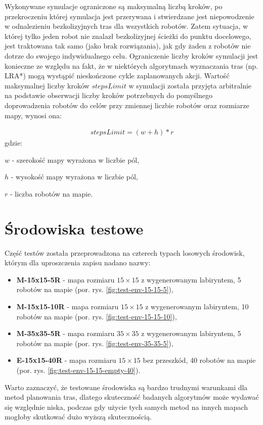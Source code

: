 Wykonywane symulacje ograniczone są maksymalną liczbą kroków, po przekroczeniu której symulacja jest przerywana i stwierdzane jest niepowodzenie w odnalezieniu bezkolizyjnych tras dla wszystkich robotów.
Zatem sytuacja, w której tylko jeden robot nie znalazł bezkolizyjnej ścieżki do punktu docelowego, jest traktowana tak samo (jako brak rozwiązania), jak gdy żaden z robotów nie dotrze do swojego indywidualnego celu.
Ograniczenie liczby kroków symulacji jest konieczne ze względu na fakt, że w niektórych algorytmach wyznaczania tras (np. LRA*) mogą wystąpić nieskończone cykle zaplanowanych akcji.
Wartość maksymalnej liczby kroków $stepsLimit$ w symulacji została przyjęta arbitralnie na podstawie obserwacji liczby kroków potrzebnych do pomyślnego doprowadzenia robotów do celów przy zmiennej liczbie robotów oraz rozmiarze mapy, wynosi ona:

\begin{gather}
 	stepsLimit = (w + h) * r
 	\label{eq:steps-limit} 
\end{gather}
 gdzie:

 $w$ - szerokość mapy wyrażona w liczbie pól,

 $h$ - wysokość mapy wyrażona w liczbie pól,

 $r$ - liczba robotów na mapie.

\section{Środowiska testowe}
Część testów została przeprowadzona na czterech typach losowych środowisk, którym dla uproszczenia zapisu nadano nazwy:
\begin{itemize}
	\item {\bf M-15x15-5R} - mapa rozmiaru $15 \times 15$ z wygenerowanym labiryntem, 5 robotów na mapie (por. rys. \ref{fig:test-env-15-15-5}),
	\item {\bf M-15x15-10R} - mapa rozmiaru $15 \times 15$ z wygenerowanym labiryntem, 10 robotów na mapie (por. rys. \ref{fig:test-env-15-15-10}),
	\item {\bf M-35x35-5R} - mapa rozmiaru $35 \times 35$ z wygenerowanym labiryntem, 5 robotów na mapie (por. rys. \ref{fig:test-env-35-35-5}),
	\item {\bf E-15x15-40R} - mapa rozmiaru $15 \times 15$ bez przeszkód, 40 robotów na mapie (por. rys. \ref{fig:test-env-15-15-empty-40}).
\end{itemize}

Warto zaznaczyć, że testowane środowiska są bardzo trudnymi warunkami dla metod planowania tras, dlatego skuteczność badanych algorytmów może wydawać się względnie niska, podczas gdy użycie tych samych metod na innych mapach mogłoby skutkować dużo wyższą skutecznością.

